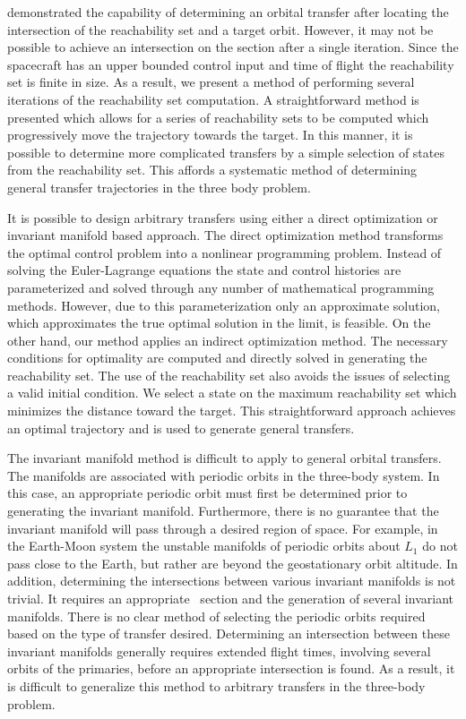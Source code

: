  demonstrated the capability of determining an orbital transfer after locating the intersection of the reachability set and a target orbit.
However, it may not be possible to achieve an intersection on the \Poincare section after a single iteration. 
Since the spacecraft has an upper bounded control input and time of flight the reachability set is finite in size. 
As a result, we present a method of performing several iterations of the reachability set computation. 
A straightforward method is presented which allows for a series of reachability sets to be computed which progressively move the trajectory towards the target.
In this manner, it is possible to determine more complicated transfers by a simple selection of states from the reachability set.
This affords a systematic method of determining general transfer trajectories in the three body problem.

It is possible to design arbitrary transfers using either a direct optimization or invariant manifold based approach.
The direct optimization method transforms the optimal control problem into a nonlinear programming problem.
Instead of solving the Euler-Lagrange equations the state and control histories are parameterized and solved through any number of mathematical programming methods.
However, due to this parameterization only an approximate solution, which approximates the true optimal solution in the limit, is feasible. 
On the other hand, our method applies an indirect optimization method.
The necessary conditions for optimality are computed and directly solved in generating the reachability set. 
The use of the reachability set also avoids the issues of selecting a valid initial condition.
We select a state on the maximum reachability set which minimizes the distance toward the target. 
This straightforward approach achieves an optimal trajectory and is used to generate general transfers.

The invariant manifold method is difficult to apply to general orbital transfers. 
The manifolds are associated with periodic orbits in the three-body system. 
In this case, an appropriate periodic orbit must first be determined prior to generating the invariant manifold.
Furthermore, there is no guarantee that the invariant manifold will pass through a desired region of space. 
For example, in the Earth-Moon system the unstable manifolds of periodic orbits about \( L_1 \) do not pass close to the Earth, but rather are beyond the geostationary orbit altitude. 
In addition, determining the intersections between various invariant manifolds is not trivial. 
It requires an appropriate \Poincare~section and the generation of several invariant manifolds.
There is no clear method of selecting the periodic orbits required based on the type of transfer desired. 
Determining an intersection between these invariant manifolds generally requires extended flight times, involving several orbits of the primaries, before an appropriate intersection is found.
As a result, it is difficult to generalize this method to arbitrary transfers in the three-body problem.

